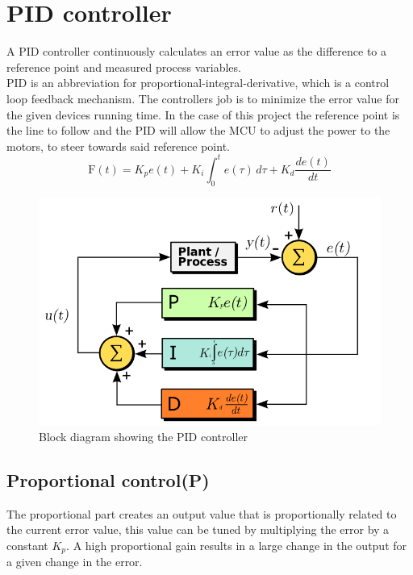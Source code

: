 \newpage

\section{PID controller} 
A PID controller continuously calculates an error value as the difference to a reference point and measured process variables.\\
PID is an abbreviation for  proportional-integral-derivative, which is a control loop feedback mechanism. The controllers job is to minimize the error value for the given devices running time. In the case of this project the reference point is the line to follow and the PID will allow the MCU to adjust the power to the motors, to steer towards said reference point.
$$\mathrm{F}(t)=K_p{e(t)} + K_{i}\int_{0}^{t}{e(\tau)}\,{d\tau} + K_{d}\frac{de(t)}{dt}$$

\begin{figure}[h!]
  \centering
  \includegraphics[width=1.0\textwidth]{figures/PID_block.png}  
\caption{Block diagram showing the PID controller}   
  \label{PID controller}
\end{figure}

\newpage

\subsection {Proportional control(P)}
The proportional part creates an output value that is proportionally related to the current error value, this value can be tuned by multiplying the error by a constant $K_p$. A high proportional gain results in a large change in the output for a given change in the error. 


